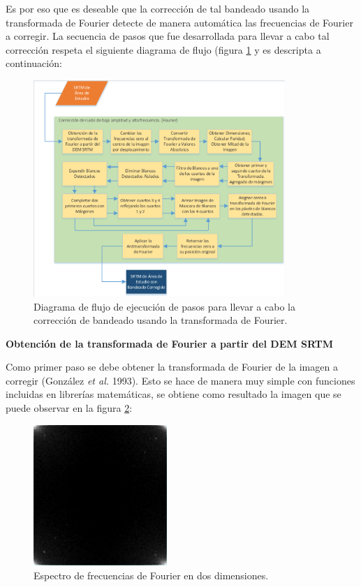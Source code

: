\documentclass[10pt,a4paper, twoside]{report}
\begin{document}
Es por eso que es deseable que la corrección de tal bandeado usando la transformada de Fourier detecte de manera automática las frecuencias de Fourier a corregir. La secuencia de pasos que fue desarrollada para llevar a cabo tal corrección respeta el siguiente diagrama de flujo (figura \ref{DiagramaFourier} y es descripta a continuación:


\begin{figure}[!htb]
   \centering      
   \includegraphics[width=0.85\textwidth]{imagenes/DiagramaFourier.pdf}
 \caption{Diagrama de flujo de ejecución de pasos para llevar a cabo la corrección de bandeado usando la transformada de Fourier.}
 \label{DiagramaFourier}
\end{figure}


\textbf{Obtención de la transformada de Fourier a partir del DEM SRTM}

Como primer paso se debe obtener la transformada de Fourier de la imagen a corregir (González \textit{et al.} 1993). Esto se hace de manera muy simple con funciones incluidas en librerías matemáticas, se obtiene como resultado la imagen que se puede observar en la figura \ref{FourierNoCentrada}:

\begin{figure}[!htb]
   \centering      
   \includegraphics[width=0.45\textwidth]{imagenes/FourierNoCentrada.jpg}
 \caption{Espectro de frecuencias de Fourier en dos dimensiones.}
 \label{FourierNoCentrada}
\end{figure}
\end{document}
